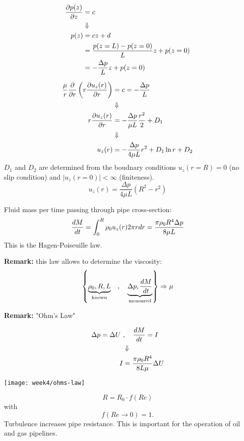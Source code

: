 \begin{align}
\frac{\partial p(z)}{\partial z}&=c \\
&\Downarrow\notag\\
p(z) &= cz+d \\
&= \frac{p(z=L)-p(z=0)}{L}z+p(z=0)\\
&= -\frac{\Delta p}{L}z + p(z=0)
\end{align}

\begin{align}
\frac{\mu}{r}\frac{\partial }{\partial r}\left(r\frac{\partial u_z(r)}{\partial r}\right) &= c = -\frac{\Delta p}{L} \\
&\Downarrow\notag\\
r\frac{\partial u_z(r)}{\partial r} &= -\frac{\Delta p}{\mu L}\frac{r^2}{2} + D_1 \\
&\Downarrow\notag\\
u_z(r) &= -\frac{\Delta p}{4\mu L}r^2 + D_1 \ln r + D_ 2 \\
\end{align}
$D_1$ and $D_2$ are determined from the boudnary conditions $u_z(r=R)=0$ (no slip condition) and $|u_z(r=0)|<\infty$ (finiteness).
\begin{equation}
u_z(r) = \frac{\Delta p}{4\mu L}\left( R^2 - r^2\right)
\end{equation}

Fluid mass per time passing through pipe cross-section:
\begin{equation}
\frac{d M}{d t} = \int_0^R\rho_0 u_z(r)2\pi r dr = \frac{\pi\rho_0 R^4\Delta p}{8\mu L}
\end{equation}
This is the Hagen-Poiseuille law.
\begin{framed}
\textbf{Remark:} this law allows to determine the viscosity:
\begin{equation}
\left\lbrace \underbrace{\rho_0,R,L}_\mathrm{known} \quad,\quad \underbrace{\Delta p,\frac{d M}{d t}}_\mathrm{measured} \right\rbrace \Rightarrow \mu
\end{equation}
\end{framed}

\begin{framed}
\textbf{Remark:} "Ohm's Law"

\begin{align}
\Delta p = \Delta U \ &,\quad \frac{d M}{d t} = I\\
&\Downarrow\notag\\
I &= \frac{\pi\rho_0 R^4}{8L\mu} \Delta U
\end{align}

{\center
\texttt{[image: week4/ohms-law]}\\
}

\begin{equation}
R = R_0\cdot f(Re)
\end{equation}
with
\begin{equation}
f(Re\rightarrow0)=1.
\end{equation}
Turbulence increases pipe resistance. This is important for the operation of oil and gas pipelines.
\end{framed}



